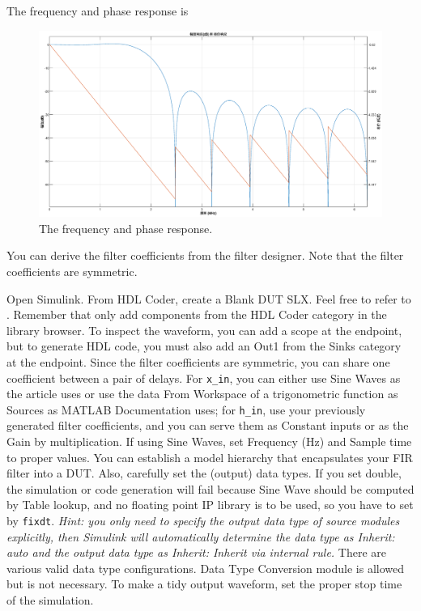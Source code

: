 \documentclass[a4paper,12pt,twoside]{article}
\begin{document}
The frequency and phase response is
\begin{figure}[H]
    \centering
    \includegraphics[width=\textwidth]{images/fvtool.eps}
    \caption{The frequency and phase response.}
\end{figure}
You can derive the filter coefficients from the filter designer. Note that the filter coefficients are symmetric.

Open Simulink. From HDL Coder, create a Blank DUT SLX. Feel free to refer to \cite{sleg}. Remember that only add components from the HDL Coder category in the library browser. To inspect the waveform, you can add a scope at the endpoint, but to generate HDL code, you must also add an Out1 from the Sinks category at the endpoint. Since the filter coefficients are symmetric, you can share one coefficient between a pair of delays. For \texttt{x\_in}, you can either use Sine Waves as the article uses or use the data From Workspace of a trigonometric function as Sources as MATLAB Documentation uses; for \texttt{h\_in}, use your previously generated filter coefficients, and you can serve them as Constant inputs or as the Gain by multiplication. If using Sine Waves, set Frequency (Hz) and Sample time to proper values. You can establish a model hierarchy that encapsulates your FIR filter into a DUT. Also, carefully set the (output) data types. If you set double, the simulation or code generation will fail because Sine Wave should be computed by Table lookup, and no floating point IP library is to be used, so you have to set by \texttt{fixdt}. \textit{Hint: you only need to specify the output data type of source modules explicitly, then Simulink will automatically determine the data type as Inherit: auto and the output data type as Inherit: Inherit via internal rule.} There are various valid data type configurations. Data Type Conversion module is allowed but is not necessary. To make a tidy output waveform, set the proper stop time of the simulation.
\end{document}
